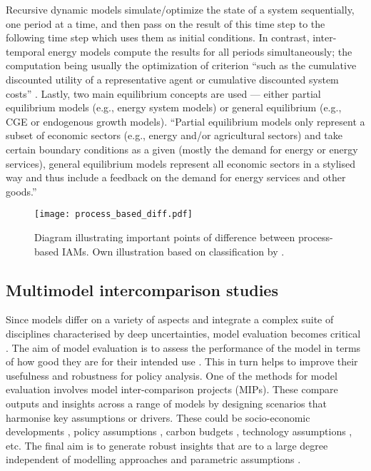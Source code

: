 \documentclass[../thesis.tex]{subfiles}
\begin{document}
\begin{enumerate}
Recursive dynamic models simulate/optimize the state of a system sequentially, one period at a time, and then pass on the result of this time step to the following time step which uses them as initial conditions. In contrast, inter-temporal energy models compute the results for all periods simultaneously; the computation being usually the optimization of criterion ``such as the cumulative discounted utility of a representative agent or cumulative discounted system costs'' \citep{krey2014}. Lastly, two main equilibrium concepts are used --- either partial equilibrium models (e.g., energy system models) or general equilibrium (e.g., CGE or endogenous growth models). 
``Partial equilibrium models only represent a subset of economic sectors (e.g., energy and/or agricultural sectors) and take certain boundary conditions as a given (mostly the demand for energy or energy services), general equilibrium models represent all economic sectors in a stylised way and thus include a feedback on the demand for energy services and other goods.'' \citep{krey2014}


\end{enumerate}

\begin{figure}[hbtp]
\centering
\texttt{[image: process\_based\_diff.pdf]}
\caption{Diagram illustrating important points of difference between process-based IAMs. Own illustration based on classification by \citet{krey2014}.}
\label{fig:process_based}
\end{figure}

\subsection{Multimodel intercomparison studies}\label{subsec:model_inter}
Since models differ on a variety of aspects and integrate a complex suite of disciplines characterised by deep uncertainties, model evaluation becomes critical \citep{wilson2021,krey2014}. The aim of model evaluation is to assess the performance of the model in terms of how good they are for their intended use \citep{oreskes1998evaluation}. This in turn helps to improve their usefulness and robustness for policy analysis. One of the methods for model evaluation involves model inter-comparison projects (MIPs). These compare outputs and insights across a range of models by designing scenarios that harmonise key assumptions or drivers. These could be socio-economic developments \citep{riahi2017a}, policy assumptions \citep{tavoni2015post}, carbon budgets \citep{bertram2021}, technology assumptions \citep{bosetti2015sensitivity}, etc. The final aim is to generate robust insights that are to a large degree independent of modelling approaches and parametric assumptions \citep{krey2014}. 
\end{document}
